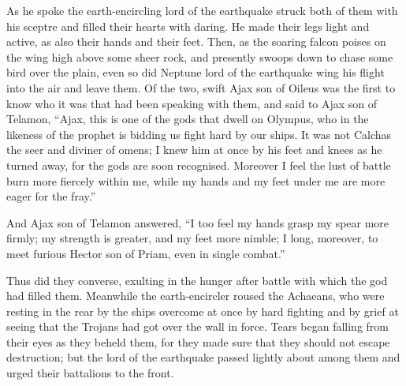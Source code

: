 As he spoke the earth-encircling lord of the earthquake struck both of
them with his sceptre and filled their hearts with daring. He made their
legs light and active, as also their hands and their feet. Then, as the
soaring falcon poises on the wing high above some sheer rock, and
presently swoops down to chase some bird over the plain, even so did
Neptune lord of the earthquake wing his flight into the air and leave
them. Of the two, swift Ajax son of Oileus was the first to know who it
was that had been speaking with them, and said to Ajax son of Telamon,
“Ajax, this is one of the gods that dwell on Olympus, who in the likeness
of the prophet is bidding us fight hard by our ships. It was not Calchas
the seer and diviner of omens; I knew him at once by his feet and knees as
he turned away, for the gods are soon recognised. Moreover I feel the lust
of battle burn more fiercely within me, while my hands and my feet under
me are more eager for the fray.”

And Ajax son of Telamon answered, “I too feel my hands grasp my spear more
firmly; my strength is greater, and my feet more nimble; I long, moreover,
to meet furious Hector son of Priam, even in single combat.”

Thus did they converse, exulting in the hunger after battle with which the
god had filled them. Meanwhile the earth-encircler roused the Achaeans,
who were resting in the rear by the ships overcome at once by hard
fighting and by grief at seeing that the Trojans had got over the wall in
force. Tears began falling from their eyes as they beheld them, for they
made sure that they should not escape destruction; but the lord of the
earthquake passed lightly about among them and urged their battalions to
the front.

